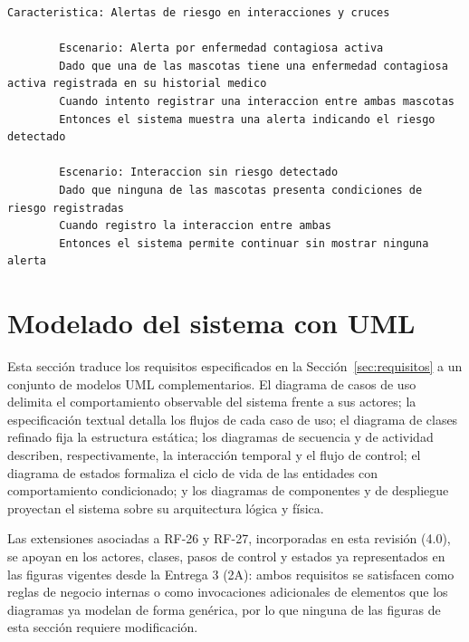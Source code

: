 \documentclass[journal,onecolumn]{IEEEtran}
\begin{document}
	\begin{lstlisting}[style=gherkin,caption={CA-15 --- Escenario de aceptación de la historia HU-15.},label={lst:ca15}]
		Caracteristica: Alertas de riesgo en interacciones y cruces
		
		Escenario: Alerta por enfermedad contagiosa activa
		Dado que una de las mascotas tiene una enfermedad contagiosa activa registrada en su historial medico
		Cuando intento registrar una interaccion entre ambas mascotas
		Entonces el sistema muestra una alerta indicando el riesgo detectado
		
		Escenario: Interaccion sin riesgo detectado
		Dado que ninguna de las mascotas presenta condiciones de riesgo registradas
		Cuando registro la interaccion entre ambas
		Entonces el sistema permite continuar sin mostrar ninguna alerta
	\end{lstlisting}
	
	\section{Modelado del sistema con UML}
	\label{sec:uml}
	
	Esta sección traduce los requisitos especificados en la
	Sección~\ref{sec:requisitos} a un conjunto de modelos UML complementarios.
	El diagrama de casos de uso delimita el comportamiento observable del
	sistema frente a sus actores; la especificación textual detalla los flujos
	de cada caso de uso; el diagrama de clases refinado fija la estructura
	estática; los diagramas de secuencia y de actividad describen,
	respectivamente, la interacción temporal y el flujo de control; el diagrama
	de estados formaliza el ciclo de vida de las entidades con comportamiento
	condicionado; y los diagramas de componentes y de despliegue proyectan el
	sistema sobre su arquitectura lógica y física.
	
	Las extensiones asociadas a RF-26 y RF-27, incorporadas en esta revisión
	(4.0), se apoyan en los actores, clases, pasos de control y estados ya
	representados en las figuras vigentes desde la Entrega 3 (2A): ambos
	requisitos se satisfacen como reglas de negocio internas o como
	invocaciones adicionales de elementos que los diagramas ya modelan de forma
	genérica, por lo que ninguna de las figuras de esta sección requiere
	modificación.
	
\end{document}
